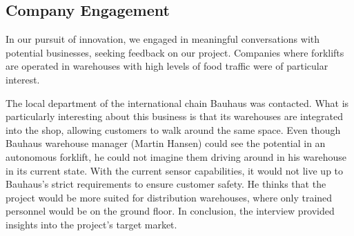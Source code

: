 \documentclass[../report.tex]{subfiles}
\begin{document}
\subsection{Company Engagement}
In our pursuit of innovation, we engaged in meaningful conversations with
potential businesses, seeking feedback on our project. Companies where
forklifts are operated in warehouses with high levels of food traffic were of
particular interest.

The local department of the international chain Bauhaus was contacted. What is
particularly interesting about this business is that its warehouses are
integrated into the shop, allowing customers to walk around the same space.
Even though Bauhaus warehouse manager (Martin Hansen) could see the potential in
an autonomous forklift, he could not imagine them driving around in his
warehouse in its current state. With the current sensor capabilities, it
would not live up to Bauhaus's strict requirements to ensure customer safety. He
thinks that the project would be more suited for distribution warehouses, where
only trained personnel would be on the ground floor. In conclusion, the
interview provided insights into the project's target market.
\end{document}
